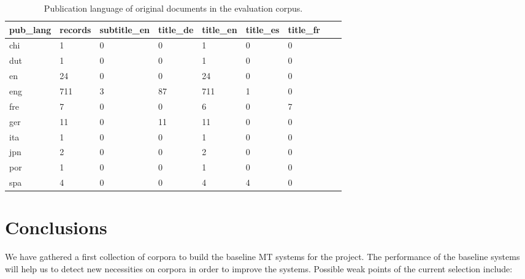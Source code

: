 \documentclass[a4paper,11pt]{article}
\begin{document}
\begin{small}
\begin{table}[]
\centering
\begin{tabular}{lllllllll}
\toprule
pub\_lang  & records  & subtitle\_en & title\_de & title\_en & title\_es & title\_fr &  \\
\midrule
chi               & 1            & 0            & 0         & 1         & 0         & 0         &  \\
dut               & 1            & 0            & 0         & 1         & 0         & 0         &  \\
en               & 24           & 0            & 0         & 24        & 0         & 0         &  \\
eng               & 711          & 3            & 87        & 711       & 1         & 0         &  \\
fre               & 7            & 0            & 0         & 6         & 0         & 7         &  \\
ger               & 11           & 0            & 11        & 11        & 0         & 0         &  \\
ita               & 1            & 0            & 0         & 1         & 0         & 0         &  \\
jpn              & 2            & 0            & 0         & 2         & 0         & 0         &  \\
por           & 1            & 0            & 0         & 1         & 0         & 0         &  \\
spa          & 4            & 0            & 0         & 4         & 4         & 0         &  \\
\bottomrule
\end{tabular}
\caption{Publication language of original documents in the evaluation corpus.}
\label{tab:publang}
\end{table}
\end{small}




\section{Conclusions}
\label{s:conclusions}

We have gathered a first collection of corpora to build the baseline MT systems for the project. The performance of the baseline systems will help us to detect new necessities on corpora in order to improve the systems. Possible weak points of the current selection include:
\end{document}
